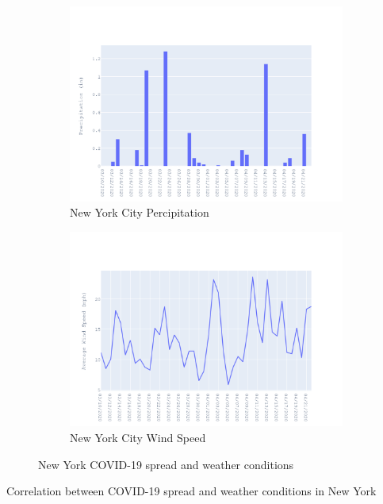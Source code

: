 \documentclass{homework}
\begin{document}
\begin{figure}[H]
  \begin{subfigure}{0.45\linewidth}
    \includegraphics[width=\linewidth]{task4/New York_rain.png}
    \caption{New York City Percipitation}
  \end{subfigure}
  \hfil
  \begin{subfigure}{0.45\linewidth}
    \includegraphics[width=\linewidth]{task4/New York_wnd.png}
    \caption{New York City Wind Speed}
  \end{subfigure}

  \caption{New York COVID-19 spread and weather conditions}
  \label{fig:task4NY}
\end{figure}

\begin{table}[H]
  \caption{Correlation between COVID-19 spread and weather conditions in New York}
  \label{Task 4 New York}
  \centering
  
\end{table}
\end{document}
